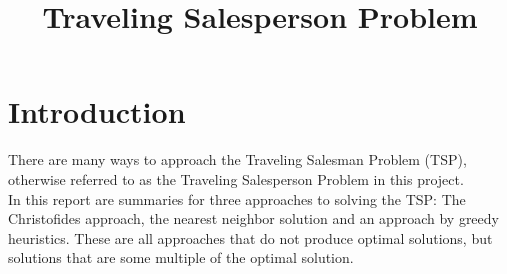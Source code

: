 \documentclass{article}
\title{Traveling Salesperson Problem}
\begin{document}
  \maketitle
  \section{Introduction}
  There are many ways to approach the Traveling Salesman Problem (TSP), otherwise referred to as the Traveling Salesperson Problem in this project.\\

  In this report are summaries for three approaches to solving the TSP: The Christofides approach, the nearest neighbor solution and an approach by greedy heuristics. These are all approaches that do not produce optimal solutions, but solutions that are some multiple of the optimal solution.

  

  

  

  {}
  
\end{document}
